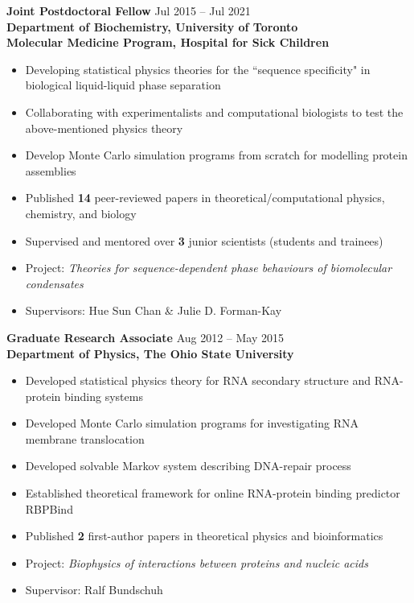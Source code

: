 \documentclass[11pt]{../yhlcv}
\begin{document}
{\bf Joint Postdoctoral Fellow} \hfill Jul 2015 -- Jul 2021\vspace{0.25em} \\
{\bf Department of Biochemistry, University of Toronto  \\ 
Molecular Medicine Program, Hospital for Sick Children}
\vspace{-0.7em}\\
\begin{itemize}[leftmargin=*]\itemsep-0.2em
\item Developing statistical physics theories for the “sequence specificity" in biological liquid-liquid
phase separation
\item Collaborating with experimentalists and computational biologists to test the above-mentioned physics theory
\item Develop Monte Carlo simulation programs from scratch for modelling protein assemblies
\item Published {\bf 14} peer-reviewed papers in theoretical/computational physics, chemistry, and biology
\item Supervised and mentored over {\bf 3} junior scientists (students and trainees)

\item[] Project: {\it Theories for sequence-dependent phase behaviours of biomolecular condensates}
\item[] Supervisors: Hue Sun Chan \& Julie D. Forman-Kay
\end{itemize} 

{\bf Graduate Research Associate} \hfill Aug 2012 -- May 2015\vspace{0.25em} \\
{\bf Department of Physics, The Ohio State University}
\vspace{-0.7em}\\
\begin{itemize}[leftmargin=*]\itemsep-0.2em
\item Developed statistical physics theory for RNA secondary structure and RNA-protein binding systems
\item Developed Monte Carlo simulation programs for investigating RNA membrane translocation
\item Developed solvable Markov system describing DNA-repair process
\item Established theoretical framework for online RNA-protein binding predictor RBPBind
\item Published {\bf 2} first-author papers in theoretical physics and bioinformatics
\item[] Project: {\it Biophysics of interactions between proteins and nucleic acids}
\item[] Supervisor: Ralf Bundschuh
\end{itemize}
\end{document}
